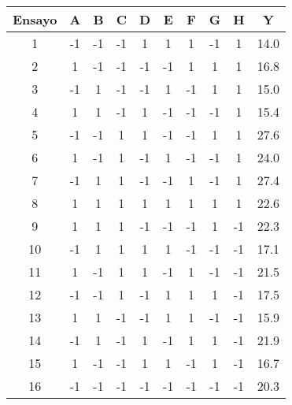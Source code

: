 \begin{center}
	\begin{tabular}{c|cccccccc|c}
		Ensayo & A & B & C & D & E & F & G & H & Y \\
		\hline
		1 & -1 & -1 & -1 & 1 & 1 & 1 & -1 & 1 & 14.0 \\
		
		2 & 1 & -1 & -1 & -1 & -1 & 1 & 1 & 1 & 16.8 \\
		
		3 & -1 & 1 & -1 & -1 & 1 & -1 & 1 & 1 & 15.0 \\
		
		4 & 1 & 1 & -1 & 1 & -1 & -1 & -1 & 1 & 15.4 \\
		
		5 & -1 & -1 & 1 & 1 & -1 & -1 & 1 & 1 & 27.6 \\
		
		6 & 1 & -1 & 1 & -1 & 1 & -1 & -1 & 1 & 24.0 \\
		
		7 & -1 & 1 & 1 & -1 & -1 & 1 & -1 & 1 & 27.4 \\
		
		8 & 1 & 1 & 1 & 1 & 1 & 1 & 1 & 1 & 22.6 \\
		
		9 & 1 & 1 & 1 & -1 & -1 & -1 & 1 & -1 & 22.3 \\
		
		10 & -1 & 1 & 1 & 1 & 1 & -1 & -1 & -1 & 17.1 \\
		
		11 & 1 & -1 & 1 & 1 & -1 & 1 & -1 & -1 & 21.5 \\
		
		12 & -1 & -1 & 1 & -1 & 1 & 1 & 1 & -1 & 17.5 \\
		
		13 & 1 & 1 & -1 & -1 & 1 & 1 & -1 & -1 & 15.9 \\
		
		14 & -1 & 1 & -1 & 1 & -1 & 1 & 1 & -1 & 21.9 \\
		
		15 & 1 & -1 & -1 & 1 & 1 & -1 & 1 & -1 & 16.7 \\
		
		16 & -1 & -1 & -1 & -1 & -1 & -1 & -1 & -1 & 20.3 \\
		
	\end{tabular}
	 \label{data_table1}
\end{center}

